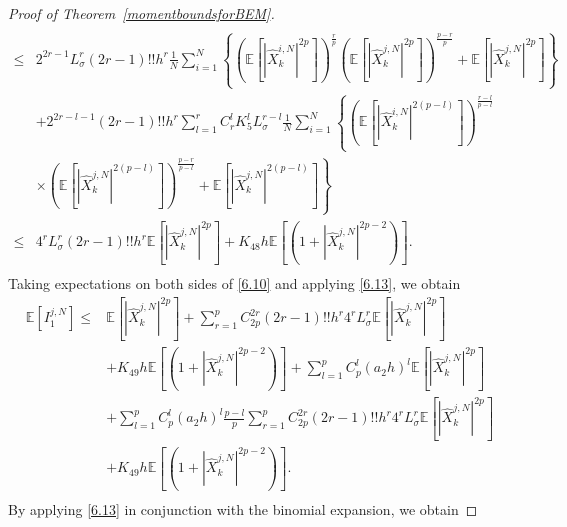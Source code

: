 \documentclass[12pt]{article}
\numberwithin{equation}{section}
\begin{document}
\begin{proof}[Proof of Theorem~\ref{momentboundsforBEM}]
\begin{equation}
\begin{aligned}
\\
\le& 2^{2r-1}L_{\sigma}^{r}\left( 2r-1 \right) !!h^r\tfrac{1}{N}\sum_{i=1}^N{\left\{ \left( \mathbb{E} \left[ \left| \hat{X}_{k}^{i,N} \right|^{2p} \right] \right) ^{\frac{r}{p}}\left( \mathbb{E} \left[ \left| \hat{X}_{k}^{j,N} \right|^{2p} \right] \right) ^{\frac{p-r}{p}}+\mathbb{E} \left[ \left| \hat{X}_{k}^{j,N} \right|^{2p} \right] \right\}}
\\
&+2^{2r-l-1}\left( 2r-1 \right) !!h^r\sum_{l=1}^r{C_{r}^{l}K_{5}^{l}L_{\sigma}^{r-l}\tfrac{1}{N}\sum_{i=1}^N{\left\{ \left( \mathbb{E} \left[ \left| \hat{X}_{k}^{i,N} \right|^{2\left( p-l \right)} \right] \right) ^{\frac{r-l}{p-l}} \right.}}
\\
 &\times \left.\left( \mathbb{E} \left[ \left| \hat{X}_{k}^{j,N} \right|^{2\left( p-l \right)} \right] \right) ^{\frac{p-r}{p-l}}+\mathbb{E} \left[ \left| \hat{X}_{k}^{j,N} \right|^{2\left( p-l \right)} \right] \right\} \\
\le& 4^rL_{\sigma}^{r}\left( 2r-1 \right) !!h^r\mathbb{E} \left[ \left| \hat{X}_{k}^{j,N} \right|^{2p} \right] +K_{48}h\mathbb{E} \left[ \left( 1+\left| \hat{X}_{k}^{j,N} \right|^{2p-2} \right) \right].\\
\end{aligned}
\end{equation}
Taking expectations on both sides of \eqref{6.10} and applying \eqref{6.13}, we obtain
\begin{equation}\tag{5.117}\label{6.14}
\begin{aligned}
\mathbb{E} \left[I_{1}^{j,N}\right]\leq & \mathbb{E} \left[\left| \hat{X}_{k}^{j,N} \right|^{2p}\right] +\sum_{r=1}^p{C_{2p}^{2r} \left( 2r-1 \right) !!h^r4^rL_{\sigma}^{r} \mathbb{E} \left[\left| \hat{X}_{k}^{j,N} \right|^{2p}\right]  }\\
&+K_{49}h \mathbb{E} \left[\left(1+\left|\hat{X}_{k}^{j,N}\right|^{2p-2}\right)\right] +\sum_{l=1}^p{C_{p}^{l}\left( a_2h \right) ^l\mathbb{E} \left[\left| \hat{X}_{k}^{j,N} \right|^{2p}\right] }\\
&+\sum_{l=1}^p{C_{p}^{l}\left( a_2h \right) ^l\tfrac{p-l}{p} \sum_{r=1}^p{C_{2p}^{2r} \left( 2r-1 \right) !!h^r4^rL_{\sigma}^{r} \mathbb{E} \left[\left| \hat{X}_{k}^{j,N} \right|^{2p}\right]  } }\\
&+K_{49}h \mathbb{E} \left[\left(1+\left|\hat{X}_{k}^{j,N}\right|^{2p-2}\right)\right].\\
\end{aligned}
\end{equation}
By applying \eqref{6.13} in conjunction with the binomial expansion, we obtain

\end{proof}
\end{document}
